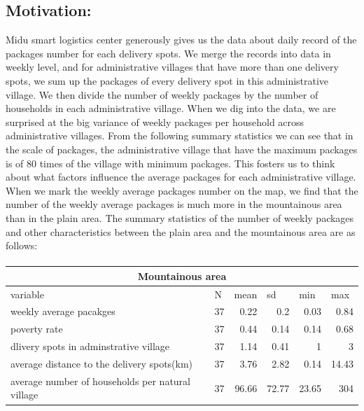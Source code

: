 \documentclass{article}
\begin{document}
\subsection{Motivation:}
Midu smart logistics center generously gives us the data about daily record of the packages number for each delivery spots. We merge the records into data in weekly level, and for administrative villages that have more than one delivery spots, we sum up the packages of every delivery spot in this administrative village. We then divide the number of weekly packages by the number of households in each administrative village. When we dig into the data, we are surprised at the big variance of weekly packages per household across administrative villages. 
From the following summary statistics we can see that in the scale of packages, the administrative village that have the maximum packages is of 80 times of the village with minimum packages. This fosters us to think about what factors influence the average packages for each administrative village. When we mark the weekly average packages number on the map, we find that the number of the weekly average packages is much more in the mountainous area than in the plain area. The summary statistics of the number of weekly packages and other characteristics between the plain area and the mountainous area are as follows:\\

\paragraph{ \newline}
\begin{tabular}{|l|r|r|r|r|r|}
    \toprule
    \multicolumn{6}{|c|}{Mountainous area} \\
    \midrule
    variable & \multicolumn{1}{l|}{N} & \multicolumn{1}{l|}{mean} & \multicolumn{1}{l|}{sd} & \multicolumn{1}{l|}{min} & \multicolumn{1}{l|}{max} \\
    \midrule
    weekly average pacakges & 37    & 0.22  & 0.2   & 0.03  & 0.84 \\
    \midrule
    poverty rate & 37    & 0.44  & 0.14  & 0.14  & 0.68 \\
    \midrule
    dlivery spots in adminstrative village & 37    & 1.14  & 0.41  & 1     & 3 \\
    \midrule
    average distance to the delivery spots(km) & 37    & 3.76  & 2.82  & 0.14  & 14.43 \\
    \midrule
    average number of households per natural village & 37    & 96.66 & 72.77 & 23.65 & 304 \\
    \bottomrule
    \end{tabular}%
\end{document}
